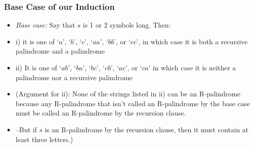 \begin{frame}
\frametitle{Base Case of our Induction}

\begin{itemize}[<+->]

\item \emph{Base case:} Say that $s$ is 1 or 2 symbols long. Then:

\item[] i) it is one of `$a$', `$b$', `$c$', `$aa$', `$bb$', or `$cc$', in which case it is both a recursive palindrome and a palindrome

\item[] ii) It is one of `$ab$', `$ba$', `$bc$', `$cb$', `$ac$', or `$ca$' in which case it is neither a palindrome nor a recursive palindrome

\item (Argument for ii): None of the strings listed in ii) can be an R-palindrome because any R-palindrome that isn't called an R-palindrome by the base case must be called an R-palindrome by the recursion clause. 

\item[] --But if $s$ is an R-palindrome by the recursion clause, then it must contain at least three letters.)

\end{itemize} 
\end{frame}


